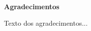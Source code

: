 {\centering\bfseries\fontsize{17}{24}\selectfont Agradecimentos \par}
\vspace{1cm}

Texto dos agradecimentos...